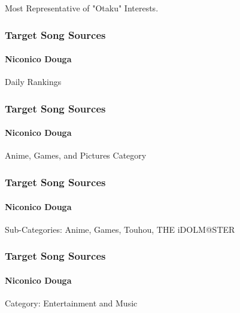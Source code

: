 \documentclass{beamer}
\begin{document}
\begin{CJK}{UTF8}{zhsong}
\begin{frame}
Most Representative of "Otaku" Interests.
\end{frame}
\begin{frame}
\frametitle{Target Song Sources}
\framesubtitle{Niconico Douga}

Daily Rankings
\end{frame}
\begin{frame}
\frametitle{Target Song Sources}
\framesubtitle{Niconico Douga}

Anime, Games, and Pictures Category
\end{frame}
\begin{frame}
\frametitle{Target Song Sources}
\framesubtitle{Niconico Douga}

Sub-Categories: Anime, Games, Touhou, THE iDOLM@STER
\end{frame}
\begin{frame}
\frametitle{Target Song Sources}
\framesubtitle{Niconico Douga}

Category: Entertainment and Music


\end{frame}
\end{CJK}
\end{document}
